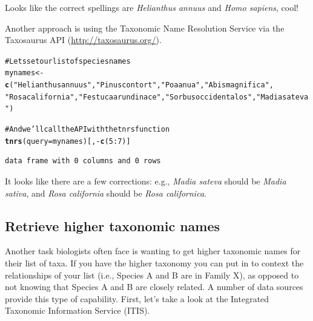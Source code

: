\documentclass[letterpaper,superscriptaddress,showkeys,longbibliography]{revtex4-1}\usepackage{graphicx, color}
\makeatletter
\newcommand{\hlfunctioncall}[1]{\textcolor[rgb]{0.501960784313725,0,0.329411764705882}{\textbf{#1}}}%
\newcommand{\hlstring}[1]{\textcolor[rgb]{0.6,0.6,1}{#1}}%
\newcommand{\hlcomment}[1]{\textcolor[rgb]{0.180392156862745,0.6,0.341176470588235}{#1}}%
\newenvironment{kframe}{%
 \def\at@end@of@kframe{}%
 \ifinner\ifhmode%
  \def\at@end@of@kframe{\end{minipage}}%
  \begin{minipage}{\columnwidth}%
 \fi\fi%
 \def\FrameCommand##1{\hskip\@totalleftmargin \hskip-\fboxsep
 \colorbox{shadecolor}{##1}\hskip-\fboxsep
     \hskip-\linewidth \hskip-\@totalleftmargin \hskip\columnwidth}%
 \MakeFramed {\advance\hsize-\width
   \@totalleftmargin\z@ \linewidth\hsize
   \@setminipage}}%
 {\par\unskip\endMakeFramed%
 \at@end@of@kframe}
\newenvironment{knitrout}{}{} %
\makeatother
\begin{document}
Looks like the correct spellings are \emph{Helianthus annuus} and \emph{Homo sapiens}, cool!

Another approach is using the Taxonomic Name Resolution Service via the Taxosaurus API (\url{http://taxosaurus.org/}).

\begin{knitrout}
\color{fgcolor}\begin{kframe}
\begin{alltt}
\hlcomment{# Lets set our list of species names}
mynames <- \hlfunctioncall{c}(\hlstring{"Helianthus annuus"}, \hlstring{"Pinus contort"}, \hlstring{"Poa anua"}, \hlstring{"Abis magnifica"}, 
    \hlstring{"Rosa california"}, \hlstring{"Festuca arundinace"}, \hlstring{"Sorbus occidentalos"}, \hlstring{"Madia sateva"})

\hlcomment{# And we'll call the API with the tnrs function}
\hlfunctioncall{tnrs}(query = mynames)[, -\hlfunctioncall{c}(5:7)]
\end{alltt}
\begin{verbatim}
data frame with 0 columns and 0 rows
\end{verbatim}
\end{kframe}
\end{knitrout}


It looks like there are a few corrections: e.g., \emph{Madia sateva} should be \emph{Madia sativa}, and \emph{Rosa california} should be \emph{Rosa californica}.

\subsection{Retrieve higher taxonomic names}

Another task biologists often face is wanting to get higher taxonomic names for their list of taxa. If you have the higher taxonomy you can put in to context the relationships of your list (i.e., Species A and B are in Family X), as opposed to not knowing that Species A and B are closely related. A number of data sources provide this type of capability. First, let's take a look at the Integrated Taxonomic Information Service (ITIS). 
\end{document}
